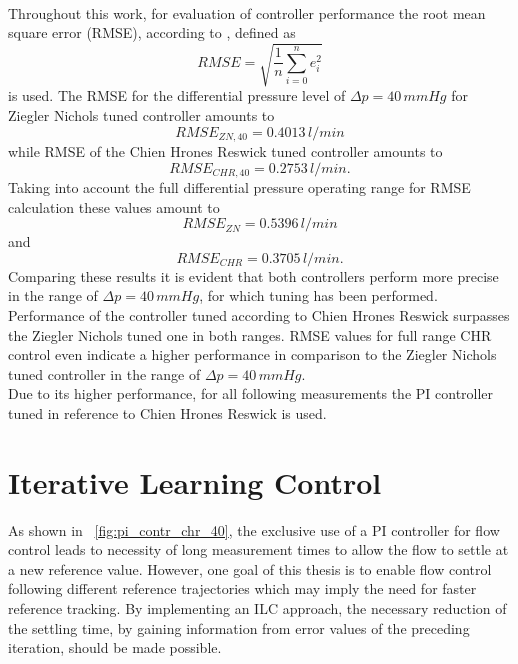 \\Throughout this work, for evaluation of controller performance the root mean square error (RMSE), according to \cite{RMSE}, defined as
\begin{equation}
  RMSE = \sqrt{\frac{1}{n}\sum_{i=0}^n e_i^2}
\end{equation}
is used. The RMSE for the differential pressure level of $\Delta{p}=40\,mmHg$ for Ziegler Nichols tuned controller amounts to
\begin{equation}
  RMSE_{ZN,40}=0.4013\,l/min
\end{equation}
while RMSE of the Chien Hrones Reswick tuned controller amounts to
\begin{equation}
  RMSE_{CHR,40}=0.2753\,l/min.
\end{equation}
Taking into account the full differential pressure operating range for RMSE calculation these values amount to
\begin{equation}
  RMSE_{ZN}=0.5396\,l/min
\end{equation}
and
\begin{equation}
  RMSE_{CHR}=0.3705\,l/min.
\end{equation}
Comparing these results it is evident that both controllers perform more precise in the range of $\Delta{p}=40\,mmHg$, for which tuning has been performed.
Performance of the controller tuned according to Chien Hrones Reswick surpasses the Ziegler Nichols tuned one in both ranges. RMSE values for full range CHR control even indicate a higher performance in comparison to the Ziegler Nichols tuned controller in the range of $\Delta{p}=40\,mmHg$.
\\ Due to its higher performance, for all following measurements the PI controller tuned in reference to Chien Hrones Reswick is used.
\section{Iterative Learning Control}\label{ILC_1}
As shown in \figurename~\ref{fig:pi_contr_chr_40}, the exclusive use of a PI controller for flow control leads to necessity of long measurement times to allow the flow to settle at a new reference value. However, one goal of this thesis is to enable flow control following different reference trajectories which may imply the need for faster reference tracking. By implementing an ILC approach, the necessary reduction of the settling time, by gaining information from error values of the preceding iteration, should be made possible.
